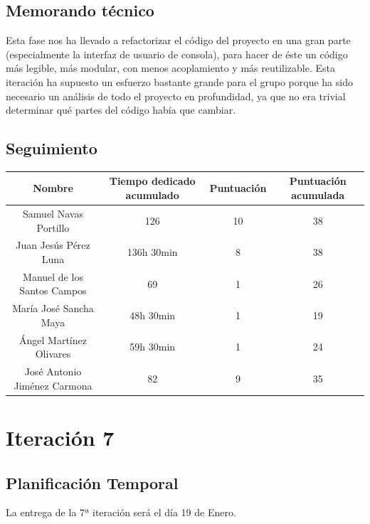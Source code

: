 \documentclass[11 pt]{book}
\begin{document}
	\section{Memorando técnico}
		Esta fase nos ha llevado a refactorizar el código del proyecto en una gran parte (especialmente la interfaz de usuario de consola), para hacer de éste un código más legible, más modular, con menos acoplamiento y más reutilizable. Esta iteración ha supuesto un esfuerzo bastante grande para el grupo porque ha sido necesario un análisis de todo el proyecto en profundidad, ya que no era trivial determinar qué partes del código había que cambiar.
		
	\section{Seguimiento}
		\begin{tabular}{|c|c|c|c|}
			\hline
			Nombre & Tiempo dedicado acumulado & Puntuación & Puntuación acumulada\\
			\hline
			Samuel Navas Portillo & 126 & 10 & 38\\
			Juan Jesús Pérez Luna & 136h 30min & 8 & 38\\
			Manuel de los Santos Campos & 69 & 1 & 26\\
			María José Sancha Maya & 48h 30min & 1 & 19\\
			Ángel Martínez Olivares & 59h 30min & 1 & 24\\
			José Antonio Jiménez Carmona & 82 & 9 & 35\\
			\hline
		\end{tabular}

\chapter{Iteración 7}
	\section{Planificación Temporal}
		La entrega de la 7ª iteración será el día 19 de Enero.
	
\end{document}
